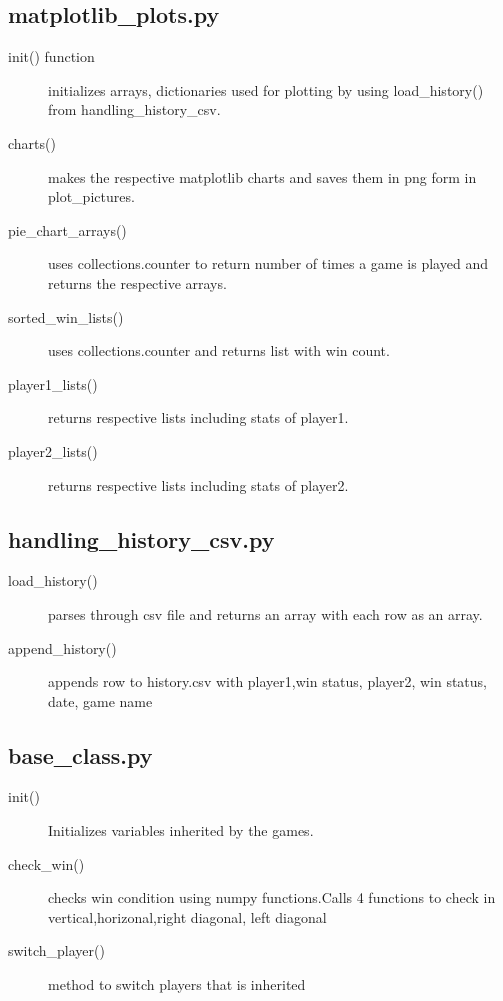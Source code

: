 \documentclass[12pt]{article}
\begin{document}
\subsection{matplotlib\_plots.py}
\begin{description}
    \item[init() function] initializes arrays, dictionaries used for plotting by using load\_history() from handling\_history\_csv.
    \item[charts()] makes the respective matplotlib charts and saves them in png form in plot\_pictures.
    \item[pie\_chart\_arrays()] uses collections.counter to return number of times a game is played and returns the respective arrays.
    \item[sorted\_win\_lists()] uses collections.counter and returns list with win count.
    \item[player1\_lists()] returns respective lists including stats of player1.
    \item[player2\_lists()] returns respective lists including stats of player2.
\end{description}

\subsection{handling\_history\_csv.py}
\begin{description}
    \item[load\_history()] parses through csv file and returns an array with each row as an array.
    \item[append\_history()] appends row to history.csv with player1,win status, player2, win status, date, game name
\end{description}

\subsection{base\_class.py}
\begin{description}
    \item[init()] Initializes variables inherited by the games.
    \item[check\_win()] checks win condition using numpy functions.Calls 4 functions to check in vertical,horizonal,right diagonal, left diagonal
    \item[switch\_player()] method to switch players that is inherited
\end{description}
\end{document}

